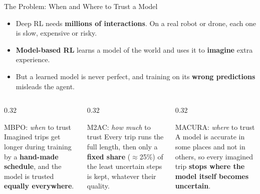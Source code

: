 \documentclass[aspectratio=169,10pt]{beamer}
\begin{document}
\begin{frame}{The Problem: When and Where to Trust a Model}
  \begin{itemize}
    \item Deep RL needs \textbf{millions of interactions}. On a real robot or drone, each one is slow, expensive or
          risky.
    \item \textbf{Model-based RL} learns a model of the world and uses it to \textbf{imagine} extra experience.
    \item But a learned model is never perfect, and training on its \textbf{wrong predictions} misleads the agent.
  \end{itemize}
  \vspace{0.3em}
  \begin{columns}[T]
    \begin{column}{0.32\textwidth}
      \begin{block}{MBPO: \emph{when} to trust}
        \small Imagined trips get longer during training by a \textbf{hand-made schedule}, and the model is trusted
        \textbf{equally everywhere}.
      \end{block}
    \end{column}
    \begin{column}{0.32\textwidth}
      \begin{block}{M2AC: \emph{how much} to trust}
        \small Every trip runs the full length, then only a \textbf{fixed share} ($\approx$25\%) of the least uncertain
        steps is kept, whatever their quality.
      \end{block}
    \end{column}
    \begin{column}{0.32\textwidth}
      \begin{block}{MACURA: \emph{where} to trust}
        \small A model is accurate in some places and not in others, so every imagined trip \textbf{stops where the
        model itself becomes uncertain}.
      \end{block}
    \end{column}
  \end{columns}
\end{frame}
\end{document}
